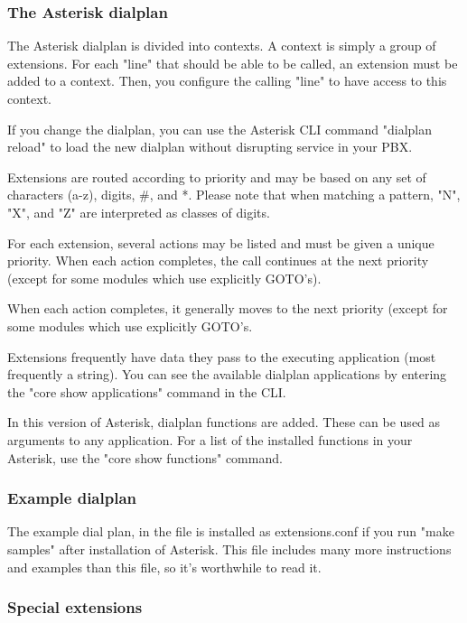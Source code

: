 \subsubsection{The Asterisk dialplan}

The Asterisk dialplan is divided into contexts. A context is simply a group
of extensions. For each "line" that should be able to be called, an extension
must be added to a context. Then, you configure the calling "line" to have
access to this context.

If you change the dialplan, you can use the Asterisk CLI command
"dialplan reload" to load the new dialplan without disrupting
service in your PBX.

Extensions are routed according to priority and may be based on any set
of characters (a-z), digits, \#, and *. Please note that when matching a
pattern, "N", "X", and "Z" are interpreted as classes of digits.

For each extension, several actions may be listed and must be given a unique
priority. When each action completes, the call continues at the next priority
(except for some modules which use explicitly GOTO's).

When each action completes, it generally moves to the next priority (except for
some modules which use explicitly GOTO's.

Extensions frequently have data they pass to the executing application
(most frequently a string).  You can see the available dialplan applications
by entering the "core show applications" command in the CLI.

In this version of Asterisk, dialplan functions are added. These can
be used as arguments to any application. For a list of the installed
functions in your Asterisk, use the "core show functions" command.

\subsubsection{Example dialplan}

The example dial plan, in the  file
is installed as extensions.conf if you run "make samples" after
installation of Asterisk. This file includes many more instructions
and examples than this file, so it's worthwhile to read it.
	
\subsubsection{Special extensions}

